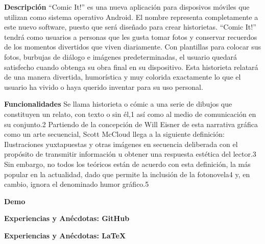 \documentclass[12pt]{report}
\begin{document}
	\vspace{7mm}

\newpage

	\begingroup
		\large{
			\textbf{
				Descripción
				\newline
				\newline
			}
		}
	\endgroup
``Comic It!'' es una nueva aplicación para disposivos móviles que utilizan como sistema operativo Android. El nombre representa completamente a este nuevo software, puesto que será diseñado para crear historietas. ``Comic It!'' tendrá como usuarios a personas que les gusta tomar fotos y conservar recuerdos de los momentos divertidos que viven diariamente.
\newline
\newline
Con plantillas para colocar sus fotos, burbujas de diálogo e imágenes predeterminadas, el usuario quedará satisfecho cuando obtenga su obra final en su dispositivo. Esta historieta relatará de una manera divertida, humorística y muy colorida exactamente lo que el usuario ha vivido o haya querido inventar para su uso personal.
	\newline
	\newline
	\newline
	\newline




\begingroup
		\large{
			\textbf{
				Funcionalidades
				\newline
				\newline
			}
		}
	\endgroup
Se llama historieta o cómic a una serie de dibujos que constituyen un relato, con texto o sin él,1 así como al medio de comunicación en su conjunto.2 Partiendo de la concepción de Will Eisner de esta narrativa gráfica como un arte secuencial, Scott McCloud llega a la siguiente definición: Ilustraciones yuxtapuestas y otras imágenes en secuencia deliberada con el propósito de transmitir información u obtener una respuesta estética del lector.3 Sin embargo, no todos los teóricos están de acuerdo con esta definición, la más popular en la actualidad, dado que permite la inclusión de la fotonovela4 y, en cambio, ignora el denominado humor gráfico.5
\newline
	\newline
	\newline
	\newline

	\begingroup
		\large{
			\textbf{
				Demo	
				\newline
				\newline
			}
		}
	\endgroup



	\begingroup
		\large{
			\textbf{
				Experiencias y Anécdotas: GitHub
				\newline
				\newline
			}
		}
	\endgroup


	\begingroup
		\large{
			\textbf{
				Experiencias y Anécdotas: LaTeX
				\newline
				\newline
			}
		}
	\endgroup
\end{document}
